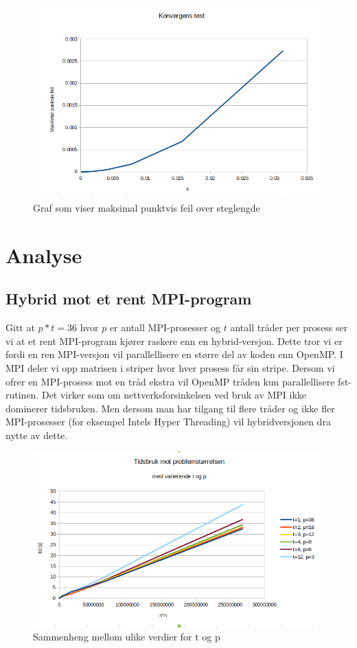 \documentclass[11pt,norsk,a4paper]{article}
\begin{document}
\begin{figure}[h]
\centering
\includegraphics[scale=0.5]{plot_konvergens.png}
\caption{Graf som viser maksimal punktvis feil over steglengde}
\end{figure}


\section{Analyse}

\subsection{Hybrid mot et rent MPI-program}

Gitt at $p*t=36$ hvor $p$ er antall MPI-prosesser og $t$ antall tråder per prosess ser vi at et rent MPI-program kjører raskere enn en hybrid-versjon. Dette tror vi er fordi en ren MPI-versjon vil parallellisere en større del av koden enn OpenMP. I MPI deler vi opp matrisen i striper hvor hver prosess får sin stripe. Dersom vi ofrer en MPI-prosess mot en tråd ekstra vil OpenMP tråden kun parallellisere fst-rutinen. Det virker som om nettverksforsinkelsen ved bruk av MPI ikke dominerer tidsbruken. Men dersom man har tilgang til flere tråder og ikke fler MPI-prosesser (for eksempel Intels Hyper Threading) vil hybridversjonen dra nytte av dette.

\begin{figure}[h]
\centering
\includegraphics[scale=0.5]{plot_t_p.png}
\caption{Sammenheng mellom ulike verdier for t og p}
\end{figure}
\end{document}
